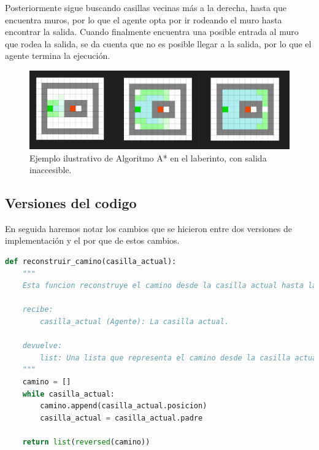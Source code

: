 Posteriormente sigue buscando casillas vecinas más a la derecha, hasta que encuentra muros, por lo que 
el agente opta por ir rodeando el muro hasta encontrar la salida. Cuando finalmente encuentra una posible
entrada al muro que rodea la salida, se da cuenta que no es posible llegar a la salida, por lo que el 
agente termina la ejecución.

\begin{figure}[H]
    \centering
    \includegraphics[width=0.9\linewidth]{IMA/RLaberinto3VCompleto.png} 
    \caption{Ejemplo ilustrativo de Algoritmo A* en el laberinto, con salida inaccesible.} 
    \label{fig:ejemplo} 
\end{figure}

\subsection*{Versiones del codigo}

En seguida haremos notar los cambios que se hicieron entre dos versiones de implementación y el por que de estos cambios.

\begin{lstlisting}[language=Python, caption=Version 1: reconstruircamino]
    def reconstruir_camino(casilla_actual):
    """
    Esta funcion reconstruye el camino desde la casilla actual hasta la posicion inicial del agente.

    recibe:
        casilla_actual (Agente): La casilla actual.

    devuelve:
        list: Una lista que representa el camino desde la casilla actual hasta la posicion inicial del agente.
    """
    camino = []
    while casilla_actual:
        camino.append(casilla_actual.posicion)
        casilla_actual = casilla_actual.padre

    return list(reversed(camino))
\end{lstlisting}

